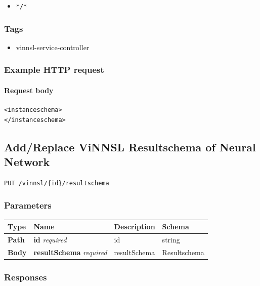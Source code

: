 \begin{itemize}
\tightlist
\item
  \texttt{*/*}
\end{itemize}

\subsubsection{Tags}\label{tags-7}

\begin{itemize}
\tightlist
\item
  vinnsl-service-controller
\end{itemize}

\subsubsection{Example HTTP request}\label{example-http-request-2}

\paragraph{Request body}\label{request-body-1}

\begin{verbatim}
<instanceschema>
</instanceschema>
\end{verbatim}

\subsection{Add/Replace ViNNSL Resultschema of Neural
Network}\label{addreplace-vinnsl-resultschema-of-neural-network}

\begin{verbatim}
PUT /vinnsl/{id}/resultschema
\end{verbatim}

\subsubsection{Parameters}\label{parameters-7}

\begin{longtable}[]{@{}llll@{}}
\toprule
Type & Name & Description & Schema\tabularnewline
\midrule
\endhead
\textbf{Path} & \textbf{id} \emph{required} & id & string\tabularnewline
\textbf{Body} & \textbf{resultSchema} \emph{required} & resultSchema &
Resultschema\tabularnewline
\bottomrule
\end{longtable}

\subsubsection{Responses}\label{responses-8}

